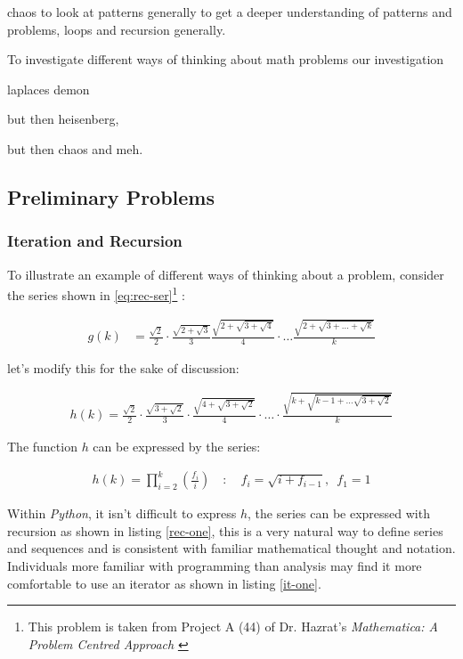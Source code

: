 \documentclass[11pt]{article}
\begin{document}
chaos to look at patterns generally to get a deeper understanding of patterns
and problems, loops and recursion generally.

To investigate different ways of thinking about math problems our investigation

laplaces demon

but then heisenberg,

but then chaos and meh.

\subsection{Preliminary Problems}
\label{sec:org70c9455}
\subsubsection{Iteration and Recursion}
\label{series-and-recursion}
To illustrate an example of different ways of thinking about a problem, consider the series shown in \eqref{eq:rec-ser}\footnote{This problem is taken from Project A (44) of Dr. Hazrat's \emph{Mathematica: A Problem Centred Approach} \cite{hazratMathematicaProblemCenteredApproach2015}} :

\begin{align}
    g\left( k \right) &=  \frac{\sqrt{2} }{2} \cdot   \frac{\sqrt{2+  \sqrt{3}}  }{3} \frac{\sqrt{2 +  \sqrt{3 +  \sqrt{4} } } }{4} \cdot  \ldots \frac{\sqrt{2 +  \sqrt{3 +  \ldots +  \sqrt{k} } } }{k} \label{eq:rec-ser}
\end{align}

let's modify this for the sake of discussion:

\begin{align}
h\left( k \right) = \frac{\sqrt{2}  }{2} \cdot  \frac{\sqrt{3 +  \sqrt{2} } }{3} \cdot  \frac{\sqrt{4 +  \sqrt{3 +  \sqrt{2} } } }{4} \cdot  \ldots \cdot  \frac{\sqrt{k +  \sqrt{k - 1 +  \ldots \sqrt{3 + \sqrt{2}  } } } }{k} \label{eq:rec-ser-mod}
\end{align}

The function \(h\) can be expressed by the series:

$$\begin{aligned}
h\left( k \right) = \prod^k_{i = 2} \left( \frac{f_i}{i}  \right)  \quad : \quad f_i = \sqrt{i +  f_{i - 1}}, \enspace f_{1} = 1
\end{aligned}$$

Within \emph{Python}, it isn't difficult to express \(h\), the series can be expressed with recursion as shown in listing \ref{rec-one}, this is a very natural way to define series and sequences and is consistent with familiar mathematical thought and notation. Individuals more familiar with programming than analysis may find it more comfortable to use an iterator as shown in listing \ref{it-one}.
\end{document}
